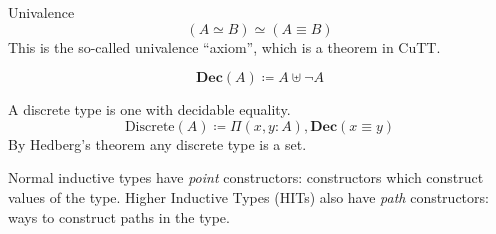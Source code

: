 \begin{romlemma}
  Univalence
  \begin{equation}
    (A \simeq B) \simeq (A \equiv B)
  \end{equation}
  This is the so-called univalence ``axiom'', which is a theorem in CuTT.
\end{romlemma}
\begin{romdefinition}[Decision]
  \begin{equation}
    \mathbf{Dec}(A) \coloneqq A \uplus \neg A
  \end{equation}
\end{romdefinition}
\begin{romdefinition}[Discrete]
  A discrete type is one with decidable equality.
  \begin{equation}
    \text{Discrete}(A) \coloneqq \Pi(x, y : A) , \mathbf{Dec}(x \equiv y)
  \end{equation}
  By Hedberg's theorem \cite{hedbergCoherenceTheoremMartinLof1998} any discrete
  type is a set.
\end{romdefinition}
\begin{romdefinition} \label{HITs}
  Normal inductive types have \emph{point} constructors: constructors which
  construct values of the type.
  Higher Inductive Types (HITs) also have \emph{path} constructors: ways to
  construct paths in the type.
\end{romdefinition}
